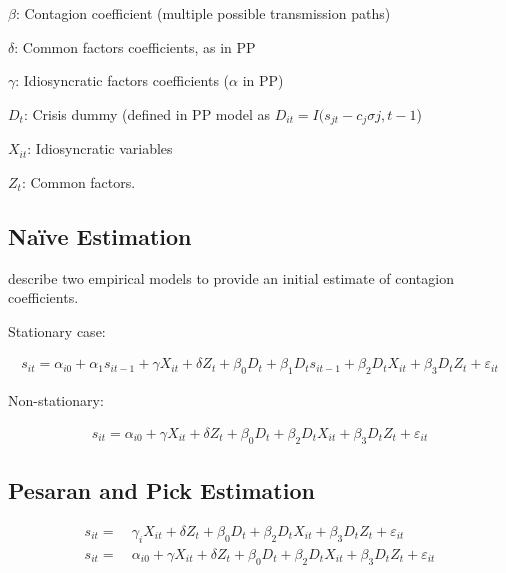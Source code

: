 \documentclass[../base.tex]{subfiles}
\begin{document}
$\beta$: Contagion coefficient (multiple possible transmission paths)

$\delta$: Common factors coefficients, as in PP

$\gamma$: Idiosyncratic factors coefficients ($\alpha$ in PP)

$D_t$: Crisis dummy (defined in PP model as $D_{it} = I(s_{jt} - c_j\sigma{j, t-1}$)

$X_{it}$: Idiosyncratic variables

$Z_t$: Common factors. 

\subsection{Na\"{i}ve Estimation}

\cite{giordano2013pure} describe two empirical models to provide an initial estimate of contagion coefficients. 

Stationary case:

\begin{align}
	s_{it} = \alpha_{i0} + \alpha_{1}s_{it-1} +\gamma X_{it} + \delta Z_t + \beta_0D_t + \beta_1D_ts_{it-1} + \beta_2D_tX_{it} + \beta_3D_tZ_t + \varepsilon_{it}
\end{align}

Non-stationary:

\begin{align}
	s_{it} = \alpha_{i0} + \gamma X_{it} + \delta Z_t + \beta_0D_t + \beta_2D_tX_{it} + \beta_3D_tZ_t + \varepsilon_{it}
\end{align}


\subsection{Pesaran and Pick Estimation}
\label{pp}

\begin{align}
	s_{it} =&~\gamma_i X_{it} + \delta Z_t + \beta_0D_t + \beta_2D_tX_{it} + \beta_3D_tZ_t + \varepsilon_{it} \\
	s_{it} =&~\alpha_{i0} + \gamma X_{it} + \delta Z_t + \beta_0D_t + \beta_2D_tX_{it} + \beta_3D_tZ_t + \varepsilon_{it} 
\end{align}
\end{document}
